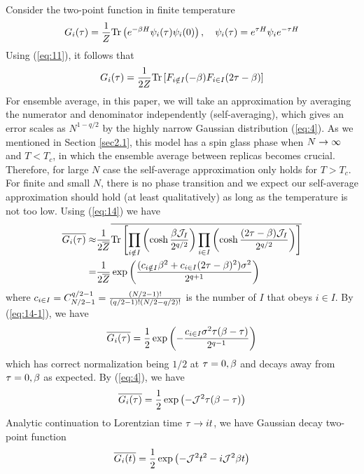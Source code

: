 \documentclass[11pt]{article}
\renewcommand{\>}{\rangle}
\newcommand{\<}{\langle}
\def\nn{\nonumber}
\begin{document}
Consider the two-point function in finite temperature
\begin{equation}
G_{i}(\tau)=\frac{1}{Z}\text{Tr}\left(e^{-\beta H}\psi_{i}(\tau)\psi_{i}(0)\right),\quad\psi_{i}(\tau)=e^{\tau H}\psi_{i}e^{-\tau H}
\end{equation}
Using (\ref{eq:11}), it follows that
\begin{equation}
G_{i}(\tau)=\frac{1}{2Z}\text{Tr}\left[F_{i\notin I}(-\beta)F_{i\in I}(2\tau-\beta)\right]
\end{equation}
For ensemble average, in this paper, we will take an approximation
by averaging the numerator and denominator independently (self-averaging), which gives
an error scales as $N^{1-q/2}$ by the highly narrow Gaussian distribution
(\ref{eq:4}). As we mentioned in Section \ref{sec2.1}, this model has a spin glass phase when $N\rightarrow\infty$ and $T<T_c$, in which the ensemble average between replicas becomes crucial. Therefore, for large $N$ case the self-average approximation only holds for $T>T_c$. For finite and small $N$, there is no phase transition and we expect our self-average approximation should hold (at least qualitatively) as long as the temperature is not too low. Using (\ref{eq:14}) we have
\begin{align}
\overline{G_{i}(\tau)}\app &\f 1{2\overline{Z}}\overline{\Tr\left[\prod_{i\notin I}\left(\cosh\f{\b\mJ_{I}}{2^{q/2}}\right)\prod_{i\in I}\left(\cosh\f{(2\tau-\b)\mJ_{I}}{2^{q/2}}\right)\right]}\nn\\
=&\f 1{2\overline{Z}}\exp\left(\f{(c_{i\notin I}\b^{2}+c_{i\in I}(2\tau-\b)^{2})\s^{2}}{2^{q+1}}\right)\label{eq:16}
\end{align}
where $c_{i\in I}=C_{N/2-1}^{q/2-1}=\frac{(N/2-1)!}{(q/2-1)!(N/2-q/2)!}$
is the number of $I$ that obeys $i\in I$. By (\ref{eq:14-1}), we
have 
\begin{equation}
\overline{G_{i}(\tau)}=\frac{1}{2}\exp\left(-\frac{c_{i\in I}\sigma^{2}\tau(\beta-\tau)}{2^{q-1}}\right)\label{eq:17}
\end{equation}
which has correct normalization being $1/2$ at $\tau=0,\beta$ and decays
away from $\tau=0,\beta$ as expected. By (\ref{eq:4}), we have 
\begin{equation}
\overline{G_{i}(\tau)}=\frac{1}{2}\exp\left(-\mathcal{J}^{2}\tau(\beta-\tau)\right)\label{eq:21}
\end{equation}
Analytic continuation to Lorentzian time $\tau\rightarrow it$, we have Gaussian
decay two-point function
\begin{equation}
\overline{G_{i}(t)}=\frac{1}{2}\exp\left(-\mathcal{J}^{2}t^{2}-i\mathcal{J}^2\beta t\right) \label{eq:thG}
\end{equation}
\end{document}
